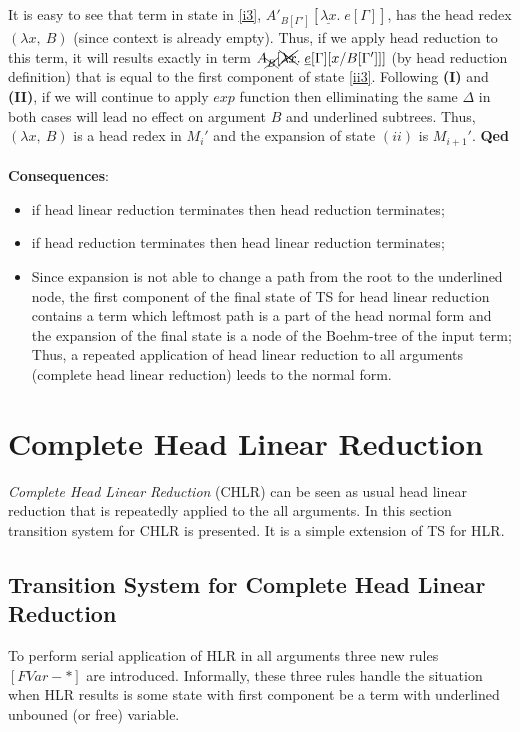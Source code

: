 \documentclass[a4paper, 10pt]{article}
\begin{document}
It is easy to see that term in state in \eqref{i3}, $A'_{B[\Gamma']}[\underline{\lambda x}.\; e[\Gamma]]$, has the head redex $(\lambda x,\ B)$ (since context is already empty). Thus, if we apply head reduction to this term, it will results exactly in term $A_{\xcancel{B}}[\xcancel{\lambda x}.\; \underline{e}[\Gamma][x/B[\Gamma']]]$ (by head reduction definition) that is equal to the first component of state \eqref{ii3}. Following \textbf{(I)} and \textbf{(II)}, if we will continue to apply $exp$ function then elliminating the same $\Delta$ in both cases will lead no effect on argument $B$ and underlined subtrees. Thus, $(\lambda x,\ B)$ is a head redex in $M_i'$ and the expansion of state $(ii)$ is $M_{i+1}'$. \hfill{\textbf{Qed}} \\ \\ 

\textbf{Consequences}:
\begin{itemize}
\item if head linear reduction terminates then head reduction terminates;
\item if head reduction terminates then head linear reduction terminates;
\item Since expansion is not able to change a path from the root to the underlined node,
  the first component of the final state of TS for head linear reduction
  contains a term which leftmost path is a part of the head normal form 
  and the expansion of the final state is a node of the Boehm-tree of the input term; \\
  Thus, a repeated application of head linear reduction to all arguments
  (complete head linear reduction) leeds to the normal form.
\end{itemize}


\section{Complete Head Linear Reduction}
\emph{Complete Head Linear Reduction} (CHLR) can be seen as usual head linear reduction that is repeatedly
applied to the all arguments.
In this section transition system for CHLR is presented. It is a simple extension of TS for HLR.

\subsection{Transition System for Complete Head Linear Reduction}

To perform serial application of HLR in all arguments three new rules $[FVar-*]$ are introduced.
Informally, these three rules handle the situation when HLR results is some state with first component
be a term with underlined unbouned (or free) variable.
\end{document}
